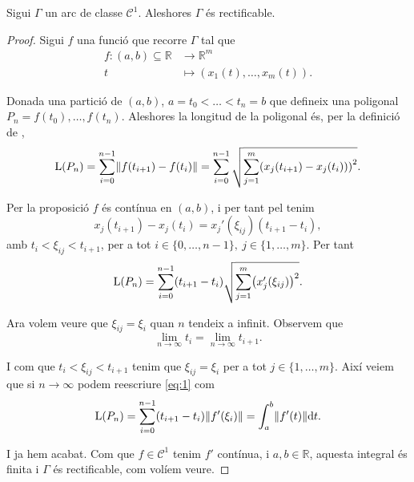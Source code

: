 \documentclass[../Apunts.tex]{subfiles}
\begin{document}
	\begin{proposition}
		Sigui \(\Gamma\) un arc de classe \(\mathcal{C}^{1}\). Aleshores \(\Gamma\) és rectificable.
		\begin{proof}
			Sigui \(f\) una funció que recorre \(\Gamma\) tal que
			\begin{align*}
			f\colon(a,b)\subseteq\mathbb{R}&\longrightarrow\mathbb{R}^{m}\\
			t&\longmapsto(x_{1}(t),\dots,x_{m}(t)).
			\end{align*}
			
			Donada una partició de \((a,b)\), \(a=t_{0}<\dots<t_{n}=b\) que defineix una poligonal \(P_{n}=f(t_{0}),\dots,f(t_{n})\). Aleshores la longitud de la poligonal  és, per la definició de ,
			\[\Long(P_n)=\sum_{i=0}^{n-1}\norm{f(t_{i+1})-f(t_{i})}=\sum_{i=0}^{n-1}\sqrt{\sum_{j=1}^{m}\left(x_{j}(t_{i+1})-x_{j}(t_{i}))\right)^{2}}.\]
			
			Per la proposició  \(f\) és contínua en \((a,b)\), i per tant pel  tenim
			\[x_{j}(t_{i+1})-x_{j}(t_{i})=x_{j}'(\xi_{ij})(t_{i+1}-t_{i}),\]
			amb \(t_{i}<\xi_{ij}<t_{i+1}\), per a tot \(i\in\{0,\dots,n-1\},\ j\in\{1,\dots,m\}\). Per tant
			\begin{equation}\label{eq:1}
			\Long(P_{n})=\sum_{i=0}^{n-1}(t_{i+1}-t_{i})\sqrt{\sum_{j=1}^{m}\left(x_{j}'(\xi_{ij})\right)^2}.
			\end{equation}
			
			Ara volem veure que \(\xi_{ij}=\xi_{i}\) quan \(n\) tendeix a infinit. Observem que
			\[\lim_{n\to\infty}t_{i}=\lim_{n\to\infty}t_{i+1}.\]
			
			I com que \(t_{i}<\xi_{ij}<t_{i+1}\) tenim que \(\xi_{ij}=\xi_{i}\) per a tot \(j\in\{1,\dots,m\}\). Així veiem que si \(n\to\infty\) podem reescriure \eqref{eq:1} com
			\begin{displaymath}
			\Long(P_{n})=\sum_{i=0}^{n-1}(t_{i+1}-t_{i})\norm{f'(\xi_{i})}=\int_{a}^{b}\norm{f'(t)}\diff t.
			\end{displaymath}
			
			I ja hem acabat. Com que \(f\in\mathcal{C}^{1}\) tenim \(f'\) contínua, i \(a,b\in\mathbb{R}\), aquesta integral és finita i \(\Gamma\) és rectificable, com volíem veure.
		\end{proof}
	\end{proposition}
\end{document}
